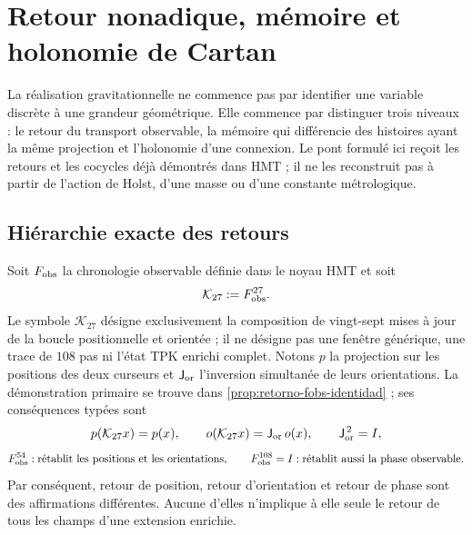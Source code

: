 \chapter{Retour nonadique, mémoire et holonomie de Cartan}
\label{chap:puente-retorno-holonomia-cartan}

La réalisation gravitationnelle ne commence pas par identifier une variable discrète
à une grandeur géométrique. Elle commence par distinguer trois niveaux : le retour
du transport observable, la mémoire qui différencie des histoires ayant la même
projection et l'holonomie d'une connexion. Le pont formulé ici
reçoit les retours et les cocycles déjà démontrés dans HMT ; il ne les reconstruit pas
à partir de l'action de Holst, d'une masse ou d'une constante métrologique.

\section{Hiérarchie exacte des retours}
\label{sec:jerarquia-retornos-27-54-108}

Soit \(F_{\rm obs}\) la chronologie observable définie dans le noyau HMT et soit
\[
 \mathcal K_{27}:=F_{\rm obs}^{27}.
\]
Le symbole \(\mathcal K_{27}\) désigne exclusivement la composition de
vingt-sept mises à jour de la boucle positionnelle et orientée ; il ne désigne pas une
fenêtre générique, une trace de \(108\) pas ni l'état TPK enrichi
complet. Notons \(p\) la projection sur les positions des deux
curseurs et \(\mathsf J_{\rm or}\) l'inversion simultanée de leurs
orientations. La démonstration primaire se trouve dans
\cref{prop:retorno-fobs-identidad} ; ses conséquences typées sont
\[
 p(\mathcal K_{27}x)=p(x),\qquad
 o(\mathcal K_{27}x)=\mathsf J_{\rm or}\,o(x),
 \qquad \mathsf J_{\rm or}^{\,2}=I,
\]
\[
 F_{\rm obs}^{54}:
 \text{rétablit les positions et les orientations},
 \qquad
 F_{\rm obs}^{108}=I:
 \text{rétablit aussi la phase observable}.
\]
Par conséquent, retour de position, retour d'orientation et retour de phase sont
des affirmations différentes. Aucune d'elles n'implique à elle seule le retour de
tous les champs d'une extension enrichie.


